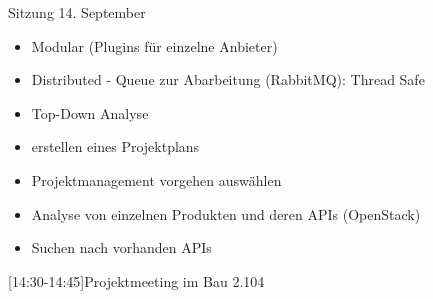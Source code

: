 
\begin{Protokoll}{Sitzung 14. September}
\protokollKopf

\begin{itemize}
  \item Modular (Plugins für einzelne Anbieter)
  \item Distributed - Queue zur Abarbeitung (RabbitMQ): Thread Safe
  \item Top-Down Analyse
\end{itemize}
\begin{itemize}
  \item erstellen eines Projektplans
  \item Projektmanagement vorgehen auswählen
\end{itemize}
\begin{itemize}
  \item Analyse von einzelnen Produkten und deren APIs (OpenStack)
  \item Suchen nach vorhanden APIs
\end{itemize}

[14:30-14:45]{Projektmeeting im Bau 2.104}



\end{Protokoll}
